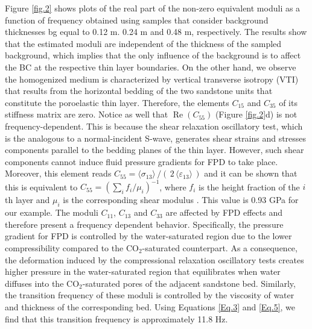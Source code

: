 \documentclass[draft]{agujournal2019}
\renewcommand{\Re}{\operatorname{Re} }
\begin{document}
Figure \ref{fig.2} shows plots of the real part of the non-zero equivalent moduli as a function of frequency obtained using samples that consider background thicknesses bg equal to 0.12 m. 0.24 m and 0.48 m, respectively. The results show that the estimated moduli are independent of the thickness of the sampled background, which implies that the only influence of the background is to affect the BC at the respective thin layer boundaries. 
On the other hand, we observe the homogenized medium is
characterized by vertical transverse isotropy (VTI) that results from the horizontal bedding of the two sandstone units that constitute the poroelastic thin layer. Therefore, the elements $C_{15}$ and $C_{35}$ of its stiffness matrix are zero. Notice as well that $\Re(C_{55})$  (Figure \ref{fig.2}d) is not frequency-dependent. This is because the shear relaxation oscillatory test, which is the analogous to a normal-incident S-wave, generates shear strains and stresses components  parallel to the bedding planes of the thin layer. However, such shear components cannot induce fluid pressure gradients for FPD to take place. Moreover, this element reads $C_{55} = \langle \sigma_{13}\rangle\,/(\,2\, \langle \varepsilon_{13} \rangle\,)$ and it can be shown that this is equivalent to $C_{55}  =\left( \sum_i f_i/\mu_i \right)^{-1}$, where $f_i$ is the height fraction of the $i$th layer and $\mu_i$ is the corresponding shear modulus \cite{Backus1962, Salamon1968}. This value is 0.93 GPa for our example. The moduli  $C_{11}$, $C_{13}$ and $C_{33}$ are affected by FPD effects and therefore present a frequency dependent behavior. Specifically, the pressure gradient for FPD is controlled by the water-saturated region due to the lower compressibility compared to the CO$_2$-saturated counterpart. As a consequence, the deformation induced by the compressional relaxation oscillatory tests creates higher pressure in the water-saturated region that equilibrates when water diffuses into the CO$_2$-saturated pores of the adjacent sandstone bed. Similarly, the transition frequency of these moduli is controlled by the viscosity of water and thickness of the corresponding bed. Using Equations \eqref{Eq.3} and \eqref{Eq.5}, we find that this transition frequency is approximately 11.8 Hz. 
\end{document}

